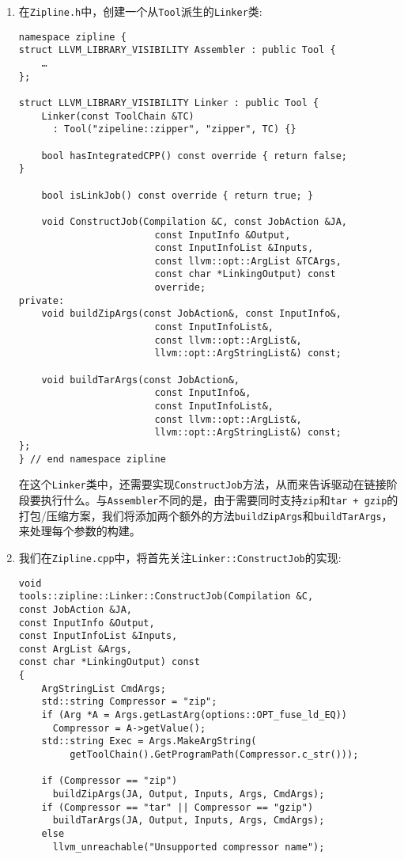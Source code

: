 \begin{enumerate}
\item 在\texttt{Zipline.h}中，创建一个从\texttt{Tool}派生的\texttt{Linker}类:

\begin{lstlisting}[style=styleCXX]
namespace zipline {
struct LLVM_LIBRARY_VISIBILITY Assembler : public Tool {
	…
};

struct LLVM_LIBRARY_VISIBILITY Linker : public Tool {
	Linker(const ToolChain &TC)
	  : Tool("zipeline::zipper", "zipper", TC) {}
	  
	bool hasIntegratedCPP() const override { return false;
}

	bool isLinkJob() const override { return true; }
	
	void ConstructJob(Compilation &C, const JobAction &JA,
						const InputInfo &Output,
						const InputInfoList &Inputs,
						const llvm::opt::ArgList &TCArgs,
						const char *LinkingOutput) const
						override;
private:
	void buildZipArgs(const JobAction&, const InputInfo&,
						const InputInfoList&,
						const llvm::opt::ArgList&,
						llvm::opt::ArgStringList&) const;
						
	void buildTarArgs(const JobAction&,
						const InputInfo&,
						const InputInfoList&,
						const llvm::opt::ArgList&,
						llvm::opt::ArgStringList&) const;
};
} // end namespace zipline
\end{lstlisting}

在这个\texttt{Linker}类中，还需要实现\texttt{ConstructJob}方法，从而来告诉驱动在链接阶段要执行什么。与\texttt{Assembler}不同的是，由于需要同时支持\texttt{zip}和\texttt{tar + gzip}的打包/压缩方案，我们将添加两个额外的方法\texttt{buildZipArgs}和\texttt{buildTarArgs}，来处理每个参数的构建。

\item 我们在\texttt{Zipline.cpp}中，将首先关注\texttt{Linker::ConstructJob}的实现:

\begin{lstlisting}[style=styleCXX]
void
tools::zipline::Linker::ConstructJob(Compilation &C,
const JobAction &JA,
const InputInfo &Output,
const InputInfoList &Inputs,
const ArgList &Args,
const char *LinkingOutput) const
{
	ArgStringList CmdArgs;
	std::string Compressor = "zip";
	if (Arg *A = Args.getLastArg(options::OPT_fuse_ld_EQ))
	  Compressor = A->getValue();
	std::string Exec = Args.MakeArgString(
	     getToolChain().GetProgramPath(Compressor.c_str()));
	
	if (Compressor == "zip")
  	  buildZipArgs(JA, Output, Inputs, Args, CmdArgs);
	if (Compressor == "tar" || Compressor == "gzip")
	  buildTarArgs(JA, Output, Inputs, Args, CmdArgs);
	else
	  llvm_unreachable("Unsupported compressor name");
	

\end{lstlisting}
\end{enumerate}
